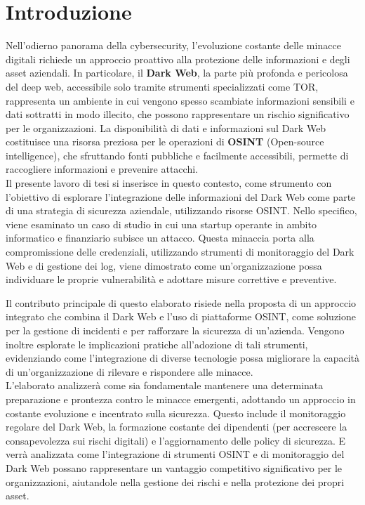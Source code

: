 \chapter*{Introduzione} %

Nell'odierno panorama della cybersecurity, l'evoluzione costante delle minacce digitali richiede un approccio proattivo alla protezione delle informazioni e degli asset aziendali. In particolare, il \textbf{Dark Web}, la parte più profonda e pericolosa del deep web, accessibile solo tramite strumenti specializzati come TOR, rappresenta un ambiente in cui vengono spesso scambiate informazioni sensibili e dati sottratti in modo illecito, che possono rappresentare un rischio significativo per le organizzazioni. La disponibilità di dati e informazioni sul Dark Web costituisce una risorsa preziosa per le operazioni di \textbf{OSINT} (Open-source intelligence), che sfruttando fonti pubbliche e facilmente accessibili, permette di raccogliere informazioni e prevenire attacchi.\\

Il presente lavoro di tesi si inserisce in questo contesto, come strumento con l'obiettivo di esplorare l'integrazione delle informazioni del Dark Web come parte di una strategia di sicurezza aziendale, utilizzando risorse OSINT. Nello specifico, viene esaminato un caso di studio in cui una startup operante in ambito informatico e finanziario subisce un attacco. Questa minaccia porta alla compromissione delle credenziali, utilizzando strumenti di monitoraggio del Dark Web e di gestione dei log, viene dimostrato come un'organizzazione possa individuare le proprie vulnerabilità e adottare misure correttive e preventive.

Il contributo principale di questo elaborato risiede nella proposta di un approccio integrato che combina il Dark Web e l'uso di piattaforme OSINT, come soluzione per la gestione di incidenti e per rafforzare la sicurezza di un'azienda. Vengono inoltre esplorate le implicazioni pratiche all'adozione di tali strumenti, evidenziando come l'integrazione di diverse tecnologie possa migliorare la capacità di un'organizzazione di rilevare e rispondere alle minacce.\\

L'elaborato analizzerà come sia fondamentale mantenere una determinata preparazione e prontezza contro le minacce emergenti, adottando un approccio in costante evoluzione e incentrato sulla sicurezza. Questo include il monitoraggio regolare del Dark Web, la formazione costante dei dipendenti (per accrescere la consapevolezza sui rischi digitali) e l'aggiornamento delle policy di sicurezza. E verrà analizzata come l'integrazione di strumenti OSINT e di monitoraggio del Dark Web possano rappresentare un vantaggio competitivo significativo per le organizzazioni, aiutandole nella gestione dei rischi e nella protezione dei propri asset.
 

\afterpage{\null\newpage}